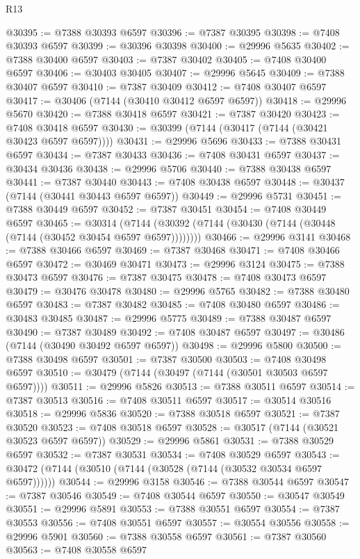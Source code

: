 \begin{lexlean}{R13}
\begin{coremodule}
@30395 := @7388 @30393 @6597
@30396 := @7387 @30395
@30398 := @7408 @30393 @6597
@30399 := @30396 @30398
@30400 := @29996 @5635
@30402 := @7388 @30400 @6597
@30403 := @7387 @30402
@30405 := @7408 @30400 @6597
@30406 := @30403 @30405
@30407 := @29996 @5645
@30409 := @7388 @30407 @6597
@30410 := @7387 @30409
@30412 := @7408 @30407 @6597
@30417 := @30406 (@7144 (@30410 @30412 @6597 @6597))
@30418 := @29996 @5670
@30420 := @7388 @30418 @6597
@30421 := @7387 @30420
@30423 := @7408 @30418 @6597
@30430 := @30399 (@7144 (@30417 (@7144 (@30421 @30423 @6597 @6597))))
@30431 := @29996 @5696
@30433 := @7388 @30431 @6597
@30434 := @7387 @30433
@30436 := @7408 @30431 @6597
@30437 := @30434 @30436
@30438 := @29996 @5706
@30440 := @7388 @30438 @6597
@30441 := @7387 @30440
@30443 := @7408 @30438 @6597
@30448 := @30437 (@7144 (@30441 @30443 @6597 @6597))
@30449 := @29996 @5731
@30451 := @7388 @30449 @6597
@30452 := @7387 @30451
@30454 := @7408 @30449 @6597
@30465 := @30314
    (@7144 (@30392 (@7144 (@30430 (@7144 (@30448 (@7144 (@30452 @30454 @6597 @6597))))))))
@30466 := @29996 @3141
@30468 := @7388 @30466 @6597
@30469 := @7387 @30468
@30471 := @7408 @30466 @6597
@30472 := @30469 @30471
@30473 := @29996 @3124
@30475 := @7388 @30473 @6597
@30476 := @7387 @30475
@30478 := @7408 @30473 @6597
@30479 := @30476 @30478
@30480 := @29996 @5765
@30482 := @7388 @30480 @6597
@30483 := @7387 @30482
@30485 := @7408 @30480 @6597
@30486 := @30483 @30485
@30487 := @29996 @5775
@30489 := @7388 @30487 @6597
@30490 := @7387 @30489
@30492 := @7408 @30487 @6597
@30497 := @30486 (@7144 (@30490 @30492 @6597 @6597))
@30498 := @29996 @5800
@30500 := @7388 @30498 @6597
@30501 := @7387 @30500
@30503 := @7408 @30498 @6597
@30510 := @30479 (@7144 (@30497 (@7144 (@30501 @30503 @6597 @6597))))
@30511 := @29996 @5826
@30513 := @7388 @30511 @6597
@30514 := @7387 @30513
@30516 := @7408 @30511 @6597
@30517 := @30514 @30516
@30518 := @29996 @5836
@30520 := @7388 @30518 @6597
@30521 := @7387 @30520
@30523 := @7408 @30518 @6597
@30528 := @30517 (@7144 (@30521 @30523 @6597 @6597))
@30529 := @29996 @5861
@30531 := @7388 @30529 @6597
@30532 := @7387 @30531
@30534 := @7408 @30529 @6597
@30543 := @30472 (@7144 (@30510 (@7144 (@30528 (@7144 (@30532 @30534 @6597 @6597))))))
@30544 := @29996 @3158
@30546 := @7388 @30544 @6597
@30547 := @7387 @30546
@30549 := @7408 @30544 @6597
@30550 := @30547 @30549
@30551 := @29996 @5891
@30553 := @7388 @30551 @6597
@30554 := @7387 @30553
@30556 := @7408 @30551 @6597
@30557 := @30554 @30556
@30558 := @29996 @5901
@30560 := @7388 @30558 @6597
@30561 := @7387 @30560
@30563 := @7408 @30558 @6597

\end{coremodule}
\end{lexlean}
